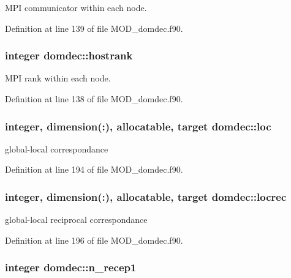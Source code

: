 M\-P\-I communicator within each node. 



Definition at line 139 of file M\-O\-D\-\_\-domdec.\-f90.

\hypertarget{classdomdec_ad66c1bf2823b5f06138088c6bee198be}{
\subsubsection[{hostrank}]{\setlength{\rightskip}{0pt plus 5cm}integer domdec\-::hostrank}}\label{classdomdec_ad66c1bf2823b5f06138088c6bee198be}


M\-P\-I rank within each node. 



Definition at line 138 of file M\-O\-D\-\_\-domdec.\-f90.

\hypertarget{classdomdec_aab28c270e201c2fea1dae1fe969ef66f}{
\subsubsection[{loc}]{\setlength{\rightskip}{0pt plus 5cm}integer, dimension(\-:), allocatable, target domdec\-::loc}}\label{classdomdec_aab28c270e201c2fea1dae1fe969ef66f}


global-\/local correspondance 



Definition at line 194 of file M\-O\-D\-\_\-domdec.\-f90.

\hypertarget{classdomdec_a881232db39ab98dcfb865d753170a69e}{
\subsubsection[{locrec}]{\setlength{\rightskip}{0pt plus 5cm}integer, dimension(\-:), allocatable, target domdec\-::locrec}}\label{classdomdec_a881232db39ab98dcfb865d753170a69e}


global-\/local reciprocal correspondance 



Definition at line 196 of file M\-O\-D\-\_\-domdec.\-f90.

\hypertarget{classdomdec_acd38a6940b147be68ded2ad9b20370f2}{
\subsubsection[{n\-\_\-recep1}]{\setlength{\rightskip}{0pt plus 5cm}integer domdec\-::n\-\_\-recep1}}\label{classdomdec_acd38a6940b147be68ded2ad9b20370f2}


